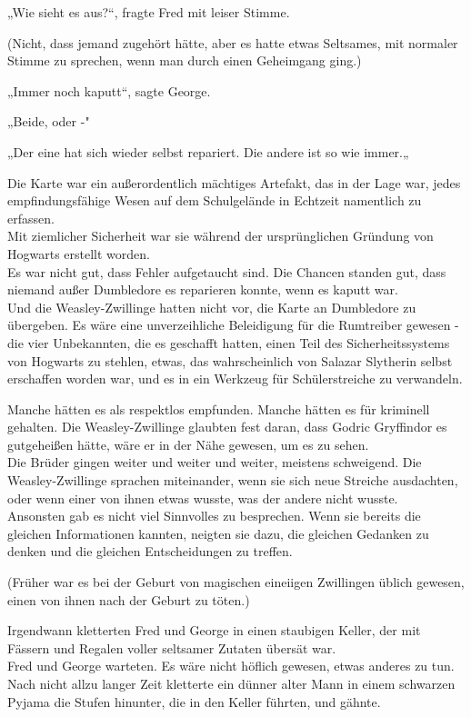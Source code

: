 {„Wie sieht es aus?“, fragte Fred mit leiser Stimme.

(Nicht, dass jemand zugehört hätte, aber es hatte etwas Seltsames, mit normaler Stimme zu sprechen, wenn man durch einen Geheimgang ging.)

„Immer noch kaputt“, sagte George.

„Beide, oder -"

„Der eine hat sich wieder selbst repariert. Die andere ist so wie immer.„

Die Karte war ein außerordentlich mächtiges Artefakt, das in der Lage war, jedes empfindungsfähige Wesen auf dem Schulgelände in Echtzeit namentlich zu erfassen.\\ Mit ziemlicher Sicherheit war sie während der ursprünglichen Gründung von Hogwarts erstellt worden.\\ Es war nicht gut, dass Fehler aufgetaucht sind. Die Chancen standen gut, dass niemand außer Dumbledore es reparieren konnte, wenn es kaputt war.\\ Und die Weasley-Zwillinge hatten nicht vor, die Karte an Dumbledore zu übergeben. Es wäre eine unverzeihliche Beleidigung für die Rumtreiber gewesen - die vier Unbekannten, die es geschafft hatten, einen Teil des Sicherheitssystems von Hogwarts zu stehlen, etwas, das wahrscheinlich von Salazar Slytherin selbst erschaffen worden war, und es in ein Werkzeug für Schülerstreiche zu verwandeln.

Manche hätten es als respektlos empfunden. Manche hätten es für kriminell gehalten. Die Weasley-Zwillinge glaubten fest daran, dass Godric Gryffindor es gutgeheißen hätte, wäre er in der Nähe gewesen, um es zu sehen.\\ Die Brüder gingen weiter und weiter und weiter, meistens schweigend. Die Weasley-Zwillinge sprachen miteinander, wenn sie sich neue Streiche ausdachten, oder wenn einer von ihnen etwas wusste, was der andere nicht wusste.\\ Ansonsten gab es nicht viel Sinnvolles zu besprechen. Wenn sie bereits die gleichen Informationen kannten, neigten sie dazu, die gleichen Gedanken zu denken und die gleichen Entscheidungen zu treffen.

(Früher war es bei der Geburt von magischen eineiigen Zwillingen üblich gewesen, einen von ihnen nach der Geburt zu töten.)

Irgendwann kletterten Fred und George in einen staubigen Keller, der mit Fässern und Regalen voller seltsamer Zutaten übersät war.\\ Fred und George warteten. Es wäre nicht höflich gewesen, etwas anderes zu tun. Nach nicht allzu langer Zeit kletterte ein dünner alter Mann in einem schwarzen Pyjama die Stufen hinunter, die in den Keller führten, und gähnte.

}
